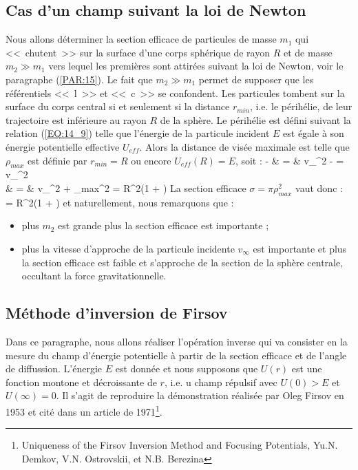 {\subsection{Cas d'un champ suivant la loi de Newton}

Nous allons d\'eterminer la section efficace de particules de masse $m_{1}$ qui <<~chutent~>> sur la surface d'une corps sph\'erique de rayon $R$ et de masse $m_{2} \gg m_{1}$ vers lequel les premi\`eres sont attir\'ees suivant la loi de Newton, voir le paragraphe (\ref{PAR:15}). Le fait que $m_{2} \gg m_{1}$ permet de supposer que les r\'ef\'erentiels <<~l~>> et <<~c~>> se confondent. Les particules tombent sur la surface du corps central si et seulement si la distance $r_{min}$, i.e. le p\'erih\'elie, de leur trajectoire est inf\'erieure au rayon $R$ de la sph\`ere. Le p\'erih\'elie est d\'efini suivant la relation (\ref{EQ:14_9}) telle que l'\'energie de la particule incident $E$ est \'egale à son \'energie potentielle effective $U_{eff}$. Alors la distance de vis\'ee maximale est telle que $\rho_{max}$ est d\'efinie par $r_{min} = R$ ou encore $U_{eff}(R) = E$, soit :
\bea
	 -  & = & v_{\infty}^{2} \Leftrightarrow {} -  = v_{\infty}^{2} \nonumber \\
	\Leftrightarrow {} & = & v_{\infty}^{2} +  \Leftrightarrow \rho_{max}^{2} = R^{2}\left(1 + \right)
\eea
La section efficace $\sigma = \pi\rho_{max}^{2}$ vaut donc :
\be
	\sigma = \pi R^{2}\left(1 + \right)
\ee
et naturellement, nous remarquons que :
\begin{itemize}
	\item plus $m_{2}$ est grande plus la section efficace est importante ;
	\item plus la vitesse d'approche de la particule incidente $v_{\infty}$ est importante et plus la section efficace est faible et s'approche de la section de la sph\`ere centrale, occultant la force gravitationnelle.
\end{itemize}

\subsection{M\'ethode d'inversion de Firsov}

Dans ce paragraphe, nous allons r\'ealiser l'op\'eration inverse qui va consister en la mesure du champ d'\'energie potentielle \`a partir de la section efficace et de l'angle de diffussion. L'\'energie $E$ est donn\'ee et nous supposons que $U(r)$ est une fonction montone et d\'ecroissante de $r$, i.e. u champ r\'epulsif avec $U(0) > E$ et $U(\infty) = 0$. Il s'agit de reproduire la d\'emonstration r\'ealis\'ee par Oleg Firsov en 1953 et cit\'e dans un article de 1971\footnote{Uniqueness of the Firsov Inversion Method and Focusing Potentials, Yu.N. Demkov, V.N. Ostrovskii, et N.B. Berezina}.

}
